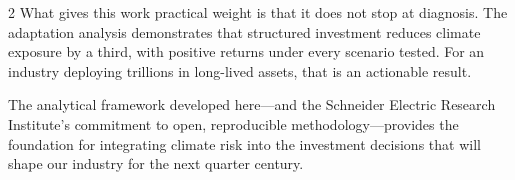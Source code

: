\begin{multicols}{2}
\noindent What gives this work practical weight is that it does not stop at diagnosis. The adaptation analysis demonstrates that structured investment reduces climate exposure by a third, with positive returns under every scenario tested. For an industry deploying trillions in long-lived assets, that is an actionable result.

\vspace{4mm}

\noindent The analytical framework developed here---and the Schneider Electric Research Institute's commitment to open, reproducible methodology---provides the foundation for integrating climate risk into the investment decisions that will shape our industry for the next quarter century.
\end{multicols}